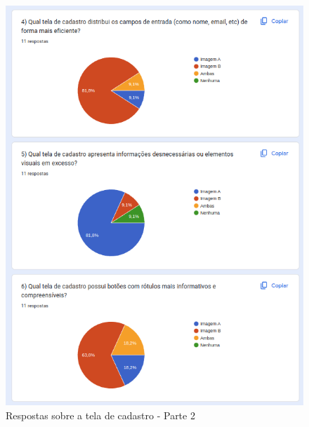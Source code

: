 \begin{figure}[!h]
	\begin{center}
	    \includegraphics[scale=0.7]{figs/Answers/Professionals/09.png}
	\end{center}
	\caption{\label{APC_TC02}Respostas sobre a tela de cadastro - Parte 2}
\end{figure}

\newpage

